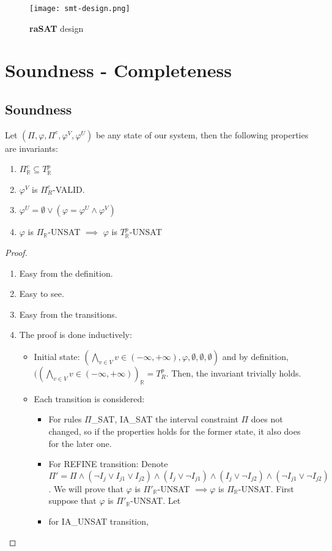 \begin{figure}[ht]
\centering
\texttt{[image: smt-design.png]} 
\caption{\textbf{raSAT} design} 
\label{fig:smt-design} 
\end{figure}

\section{Soundness - Completeness}
\subsection{Soundness}
\begin{theorem}
Let $(\Pi, \varphi, \Pi^c, \varphi^V, \varphi^U)$ be any state of our system, then the following properties are invariants:
\begin{enumerate}
\item $\Pi^c_\mathbb{R} \subseteq T^p_\mathbb{R}$
\item $\varphi^V$ is $\Pi^c_{R}$-VALID.
\item $\varphi^U = \emptyset \vee (\varphi = \varphi^U \wedge \varphi^V)$
\item $\varphi$ is $\Pi_\mathbb{R}$-UNSAT $\implies$ $\varphi$ is $T^p_\mathbb{R}$-UNSAT
\end{enumerate}
\end{theorem}

\begin{proof}
\begin{enumerate}
\item Easy from the definition.
\item Easy to see.
\item Easy from the transitions.
\item The proof is done inductively:
\begin{itemize}
\item Initial state: $(\bigwedge\limits_{v \in V}v \in (-\infty, +\infty), \varphi, \emptyset, \emptyset, \emptyset)$ and by definition, $((\bigwedge\limits_{v \in V}v \in (-\infty, +\infty))_\mathbb{R} = T^p_R$. Then, the invariant trivially holds.
\item Each transition is considered:
\begin{itemize}
\item For rules $\Pi$\_SAT, IA\_SAT the interval constraint $\Pi$ does not changed, so if the properties holds for the former state, it also does for the later one.
\item For REFINE transition: Denote $\Pi' = \Pi \wedge (\neg I_j \vee I_{j1} \vee I_{j2}) \wedge (I_j \vee \neg I_{j1}) \wedge (I_j \vee \neg I_{j2}) \wedge (\neg I_{j1} \vee \neg I_{j2})$. We will prove that $\varphi$ is $\Pi'_\mathbb{R}$-UNSAT $\implies \varphi$ is $\Pi_\mathbb{R}$-UNSAT. First suppose that $\varphi$ is $\Pi'_\mathbb{R}$-UNSAT. Let
\item for IA\_UNSAT transition, 
\end{itemize}
\end{itemize}
\end{enumerate}
\end{proof}

